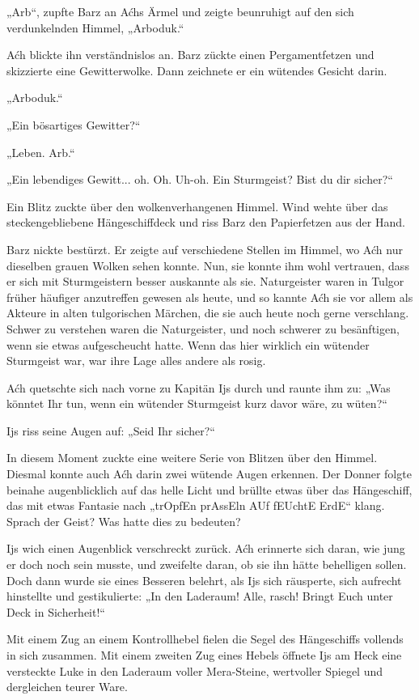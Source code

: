 „Arb“, zupfte Barz an Aćhs Ärmel und zeigte beunruhigt auf den sich verdunkelnden Himmel, „Arboduk.“

Aćh blickte ihn verständnislos an. Barz zückte einen Pergamentfetzen und skizzierte eine Gewitterwolke. Dann zeichnete er ein wütendes Gesicht darin.

„Arboduk.“

„Ein bösartiges Gewitter?“

„Leben. Arb.“

„Ein lebendiges Gewitt... oh. Oh. Uh-oh. Ein Sturmgeist? Bist du dir sicher?“

Ein Blitz zuckte über den wolkenverhangenen Himmel. Wind wehte über das steckengebliebene Hängeschiffdeck und riss Barz den Papierfetzen aus der Hand.

Barz nickte bestürzt. Er zeigte auf verschiedene Stellen im Himmel, wo Aćh nur dieselben grauen Wolken sehen konnte. Nun, sie konnte ihm wohl vertrauen, dass er sich mit Sturmgeistern besser auskannte als sie. Naturgeister waren in Tulgor früher häufiger anzutreffen gewesen als heute, und so kannte Aćh sie vor allem als Akteure in alten tulgorischen Märchen, die sie auch heute noch gerne verschlang. Schwer zu verstehen waren die Naturgeister, und noch schwerer zu besänftigen, wenn sie etwas aufgescheucht hatte. Wenn das hier wirklich ein wütender Sturmgeist war, war ihre Lage alles andere als rosig.

Aćh quetschte sich nach vorne zu Kapitän Ijs durch und raunte ihm zu: „Was könntet Ihr tun, wenn ein wütender Sturmgeist kurz davor wäre, zu wüten?“

Ijs riss seine Augen auf: „Seid Ihr sicher?“

In diesem Moment zuckte eine weitere Serie von Blitzen über den Himmel. Diesmal konnte auch Aćh darin zwei wütende Augen erkennen. Der Donner folgte beinahe augenblicklich auf das helle Licht und brüllte etwas über das Hängeschiff, das mit etwas Fantasie nach „trOpfEn prAssEln AUf fEUchtE ErdE“ klang. Sprach der Geist? Was hatte dies zu bedeuten?

Ijs wich einen Augenblick verschreckt zurück. Aćh erinnerte sich daran, wie jung er doch noch sein musste, und zweifelte daran, ob sie ihn hätte behelligen sollen. Doch dann wurde sie eines Besseren belehrt, als Ijs sich räusperte, sich aufrecht hinstellte und gestikulierte: „In den Laderaum! Alle, rasch! Bringt Euch unter Deck in Sicherheit!“

Mit einem Zug an einem Kontrollhebel fielen die Segel des Hängeschiffs vollends in sich zusammen. Mit einem zweiten Zug eines Hebels öffnete Ijs am Heck eine versteckte Luke in den Laderaum voller Mera-Steine, wertvoller Spiegel und dergleichen teurer Ware.

